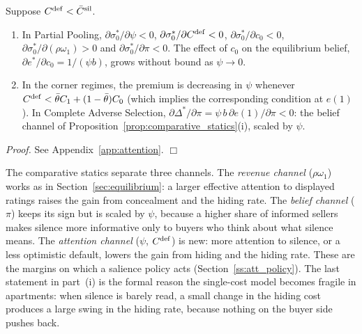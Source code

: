 \begin{proposition}
\label{prop:att_cs}
Suppose $C^{\rm def}<\bar C^{\rm sil}$.
\begin{enumerate}[label=(\roman*)]
    \item In Partial Pooling, $\partial\sigma_0^*/\partial\psi<0$, $\partial\sigma_0^*/\partial C^{\rm def}<0$, $\partial\sigma_0^*/\partial c_0<0$, $\partial\sigma_0^*/\partial(\rho\omega_1)>0$ and $\partial\sigma_0^*/\partial\pi<0$. The effect of $c_0$ on the equilibrium belief, $\partial e^*/\partial c_0=1/(\psi b)$, grows without bound as $\psi\to0$.
    \item In the corner regimes, the premium is decreasing in $\psi$ whenever $C^{\rm def}<\bar\theta C_1+(1-\bar\theta)C_0$ (which implies the corresponding condition at $e(1)$). In Complete Adverse Selection, $\partial\Delta^*/\partial\pi=\psi\,b\,\partial e(1)/\partial\pi<0$: the belief channel of Proposition~\ref{prop:comparative_statics}(i), scaled by $\psi$.
\end{enumerate}
\end{proposition}

\noindent\textit{Proof.} See Appendix~\ref{app:attention}. $\Box$

The comparative statics separate three channels. The \emph{revenue channel} ($\rho\omega_1$) works as in Section~\ref{sec:equilibrium}: a larger effective attention to displayed ratings raises the gain from concealment and the hiding rate. The \emph{belief channel} ($\pi$) keeps its sign but is scaled by $\psi$, because a higher share of informed sellers makes silence more informative only to buyers who think about what silence means. The \emph{attention channel} ($\psi$, $C^{\rm def}$) is new: more attention to silence, or a less optimistic default, lowers the gain from hiding and the hiding rate. These are the margins on which a salience policy acts (Section~\ref{ss:att_policy}). The last statement in part~(i) is the formal reason the single-cost model becomes fragile in apartments: when silence is barely read, a small change in the hiding cost produces a large swing in the hiding rate, because nothing on the buyer side pushes back.

